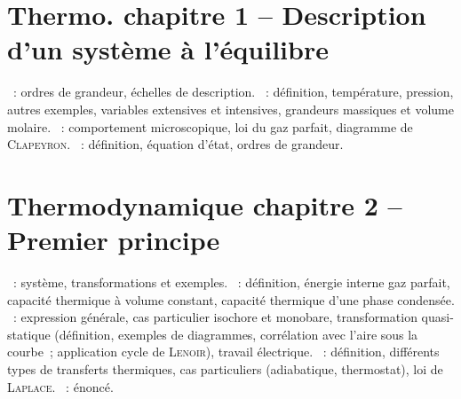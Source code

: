 \documentclass[a4paper, 10pt, final, garamond]{book}
\begin{document}
\section*{Thermo. chapitre 1 -- Description d'un système à l'équilibre}
\begin{enumerate}[label=\Roman*]
  ~: ordres de grandeur, échelles de description.
  ~: définition, température, pression, autres exemples,
    variables extensives et intensives, grandeurs massiques et volume molaire.
  ~: comportement microscopique, loi du gaz parfait,
    diagramme de \textsc{Clapeyron}.
  ~: définition, équation d'état, ordres de
    grandeur.
\end{enumerate}

\section*{Thermodynamique chapitre 2 -- Premier principe}
\begin{enumerate}[label=\Roman*]
  ~: système, transformations et exemples.
  ~: définition, énergie interne gaz parfait, capacité
    thermique à volume constant, capacité thermique d'une phase condensée.
  ~: expression générale, cas particulier
    isochore et monobare, transformation quasi-statique (définition, exemples de
    diagrammes, corrélation avec l'aire sous la courbe~; application cycle de
    \textsc{Lenoir}), travail électrique.
  ~: définition, différents types de transferts
    thermiques, cas particuliers (adiabatique, thermostat), loi de
    \textsc{Laplace}.
  ~: énoncé.
\end{enumerate}
\end{document}
